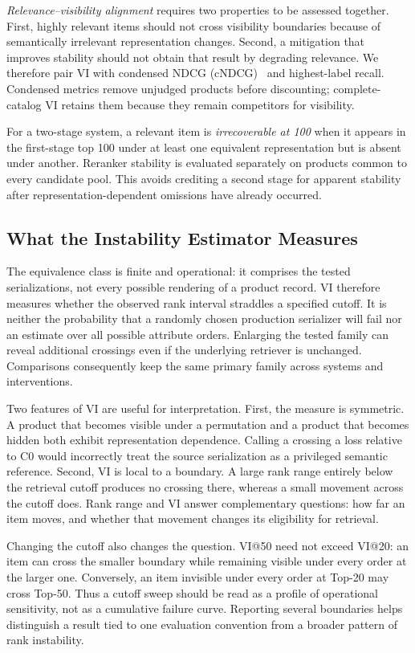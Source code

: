 \emph{Relevance--visibility alignment} requires two properties to be assessed together. First, highly relevant items should not cross visibility boundaries because of semantically irrelevant representation changes. Second, a mitigation that improves stability should not obtain that result by degrading relevance. We therefore pair VI with condensed NDCG (cNDCG)~\cite{jarvelin2002cumulated,sakai2008alternatives} and highest-label recall. Condensed metrics remove unjudged products before discounting; complete-catalog VI retains them because they remain competitors for visibility.

For a two-stage system, a relevant item is \emph{irrecoverable at 100} when it appears in the first-stage top 100 under at least one equivalent representation but is absent under another. Reranker stability is evaluated separately on products common to every candidate pool. This avoids crediting a second stage for apparent stability after representation-dependent omissions have already occurred.

\subsection{What the Instability Estimator Measures}

The equivalence class is finite and operational: it comprises the tested serializations, not every possible rendering of a product record. VI therefore measures whether the observed rank interval straddles a specified cutoff. It is neither the probability that a randomly chosen production serializer will fail nor an estimate over all possible attribute orders. Enlarging the tested family can reveal additional crossings even if the underlying retriever is unchanged. Comparisons consequently keep the same primary family across systems and interventions.

Two features of VI are useful for interpretation. First, the measure is symmetric. A product that becomes visible under a permutation and a product that becomes hidden both exhibit representation dependence. Calling a crossing a loss relative to C0 would incorrectly treat the source serialization as a privileged semantic reference. Second, VI is local to a boundary. A large rank range entirely below the retrieval cutoff produces no crossing there, whereas a small movement across the cutoff does. Rank range and VI answer complementary questions: how far an item moves, and whether that movement changes its eligibility for retrieval.

Changing the cutoff also changes the question. VI@50 need not exceed VI@20: an item can cross the smaller boundary while remaining visible under every order at the larger one. Conversely, an item invisible under every order at Top-20 may cross Top-50. Thus a cutoff sweep should be read as a profile of operational sensitivity, not as a cumulative failure curve. Reporting several boundaries helps distinguish a result tied to one evaluation convention from a broader pattern of rank instability.

